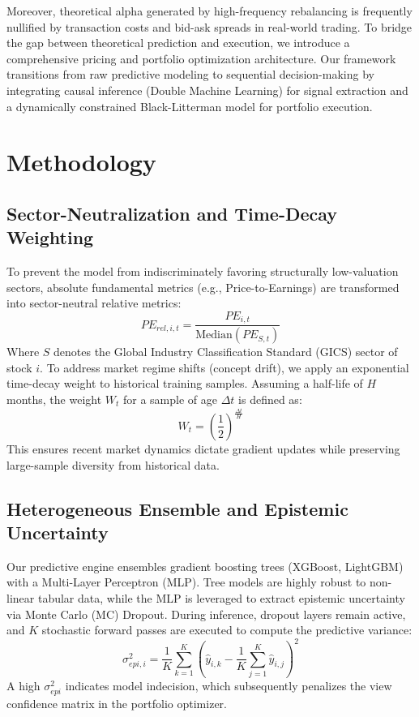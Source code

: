 \documentclass[11pt, a4paper]{article}
\begin{document}
Moreover, theoretical alpha generated by high-frequency rebalancing is frequently nullified by transaction costs and bid-ask spreads in real-world trading. To bridge the gap between theoretical prediction and execution, we introduce a comprehensive pricing and portfolio optimization architecture. Our framework transitions from raw predictive modeling to sequential decision-making by integrating causal inference (Double Machine Learning) for signal extraction and a dynamically constrained Black-Litterman model for portfolio execution.

\section{Methodology}

\subsection{Sector-Neutralization and Time-Decay Weighting}
To prevent the model from indiscriminately favoring structurally low-valuation sectors, absolute fundamental metrics (e.g., Price-to-Earnings) are transformed into sector-neutral relative metrics:
\begin{equation}
PE_{rel, i, t} = \frac{PE_{i, t}}{\text{Median}(PE_{S, t})}
\end{equation}
Where $S$ denotes the Global Industry Classification Standard (GICS) sector of stock $i$. To address market regime shifts (concept drift), we apply an exponential time-decay weight to historical training samples. Assuming a half-life of $H$ months, the weight $W_t$ for a sample of age $\Delta t$ is defined as:
\begin{equation}
W_t = \left(\frac{1}{2}\right)^{\frac{\Delta t}{H}}
\end{equation}
This ensures recent market dynamics dictate gradient updates while preserving large-sample diversity from historical data.

\subsection{Heterogeneous Ensemble and Epistemic Uncertainty}
Our predictive engine ensembles gradient boosting trees (XGBoost, LightGBM) with a Multi-Layer Perceptron (MLP). Tree models are highly robust to non-linear tabular data, while the MLP is leveraged to extract epistemic uncertainty via Monte Carlo (MC) Dropout. During inference, dropout layers remain active, and $K$ stochastic forward passes are executed to compute the predictive variance:
\begin{equation}
\sigma_{epi, i}^2 = \frac{1}{K} \sum_{k=1}^{K} \left(\hat{y}_{i,k} - \frac{1}{K}\sum_{j=1}^{K}\hat{y}_{i,j}\right)^2
\end{equation}
A high $\sigma_{epi}^2$ indicates model indecision, which subsequently penalizes the view confidence matrix in the portfolio optimizer.
\end{document}
